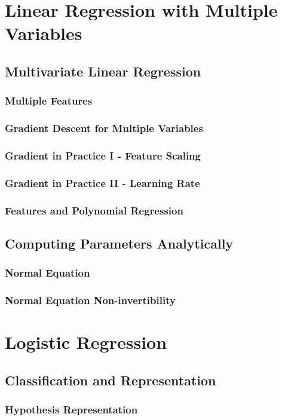 \documentclass{article}
\begin{document}
\section{Linear Regression with Multiple Variables}
\subsection{Multivariate Linear Regression}
\subsubsection{Multiple Features}
\subsubsection{Gradient Descent for Multiple Variables}
\subsubsection{Gradient in Practice I - Feature Scaling}
\subsubsection{Gradient in Practice II - Learning Rate}
\subsubsection{Features and Polynomial Regression}
\subsection{Computing Parameters Analytically}
\subsubsection{Normal Equation}
\subsubsection{Normal Equation Non-invertibility}

\section{Logistic Regression}
\subsection{Classification and Representation}
\subsubsection{Hypothesis Representation}
\end{document}
